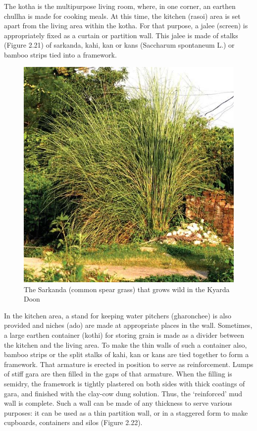 The kotha is the multipurpose living room, where, in one corner, an earthen chullha is made for cooking meals. At this time, the kitchen (rasoi) area is set apart from the living area within the kotha. For that purpose, a jalee (screen) is appropriately fixed as a curtain or partition wall. This jalee is made of stalks (Figure 2.21) of sarkanda, kahi, kan or kans (Saccharum spontaneum L.) or bamboo strips tied into a framework.

\begin{figure}[!htbp]
\includegraphics[scale=.33]{images/chap02-21.jpg}
\caption{The Sarkanda (common spear grass) that grows wild in the Kyarda Doon}\label{chap02-fig21}
\end{figure}

In the kitchen area, a stand for keeping water pitchers (gharonchee) is also provided and niches (ado) are made at appropriate places in the wall. Sometimes, a large earthen container (kothi) for storing grain is made as a divider between the kitchen and the living area. To make the thin walls of such a container also, bamboo strips or the split stalks of kahi, kan or kans are tied together to form a framework. That armature is erected in position to serve as reinforcement. Lumps of stiff gara are then filled in the gaps of that armature. When the filling is semidry, the framework is tightly plastered on both sides with thick coatings of gara, and finished with the clay-cow dung solution. Thus, the ‘reinforced’ mud wall is complete. Such a wall can be made of any thickness to serve various purposes: it can be used as a thin partition wall, or in a staggered form to make cupboards, containers and silos (Figure 2.22).

